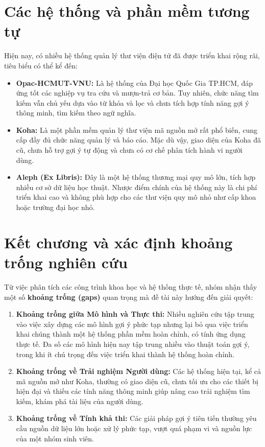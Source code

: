 \section{Các hệ thống và phần mềm tương tự}

Hiện nay, có nhiều hệ thống quản lý thư viện điện tử đã được triển khai rộng rãi, tiêu biểu có thể kể đến:

\begin{itemize}
    \item \textbf{Opac-HCMUT-VNU:} Là hệ thống của Đại học Quốc Gia TP.HCM, đáp ứng tốt các nghiệp vụ tra cứu và mượn-trả cơ bản. Tuy nhiên, chức năng tìm kiếm vẫn chủ yếu dựa vào từ khóa và lọc và chưa tích hợp tính năng gợi ý thông minh, tìm kiếm theo ngữ nghĩa.

    \item \textbf{Koha:} Là một phần mềm quản lý thư viện mã nguồn mở rất phổ biến, cung cấp đầy đủ chức năng quản lý và báo cáo. Mặc dù vậy, giao diện của Koha đã cũ, chưa hỗ trợ gợi ý tự động và chưa có cơ chế phân tích hành vi người dùng.

    \item \textbf{Aleph (Ex Libris):} Đây là một hệ thống thương mại quy mô lớn, tích hợp nhiều cơ sở dữ liệu học thuật. Nhược điểm chính của hệ thống này là chi phí triển khai cao và không phù hợp cho các thư viện quy mô nhỏ như cấp khoa hoặc trường đại học nhỏ.
\end{itemize}

\section{Kết chương và xác định khoảng trống nghiên cứu}

Từ việc phân tích các công trình khoa học và hệ thống thực tế, nhóm nhận thấy một số \textbf{khoảng trống (gaps)} quan trọng mà đề tài này hướng đến giải quyết:

\begin{enumerate}
    \item \textbf{Khoảng trống giữa Mô hình và Thực thi:} Nhiều nghiên cứu tập trung vào việc xây dựng các mô hình gợi ý phức tạp nhưng lại bỏ qua việc triển khai chúng thành một hệ thống phần mềm hoàn chỉnh, có tính ứng dụng thực tế. Đa số các mô hình hiện nay tập trung nhiều vào thuật toán gợi ý, trong khi ít chú trọng đến việc triển khai thành hệ thống hoàn chỉnh.

    \item \textbf{Khoảng trống về Trải nghiệm Người dùng:} Các hệ thống hiện tại, kể cả mã nguồn mở như Koha, thường có giao diện cũ, chưa tối ưu cho các thiết bị hiện đại và thiếu các tính năng thông minh giúp nâng cao trải nghiệm tìm kiếm, khám phá tài liệu của người dùng.

    \item \textbf{Khoảng trống về Tính khả thi:} Các giải pháp gợi ý tiên tiến thường yêu cầu nguồn dữ liệu lớn hoặc xử lý phức tạp, vượt quá phạm vi và nguồn lực của một nhóm sinh viên.
\end{enumerate}

